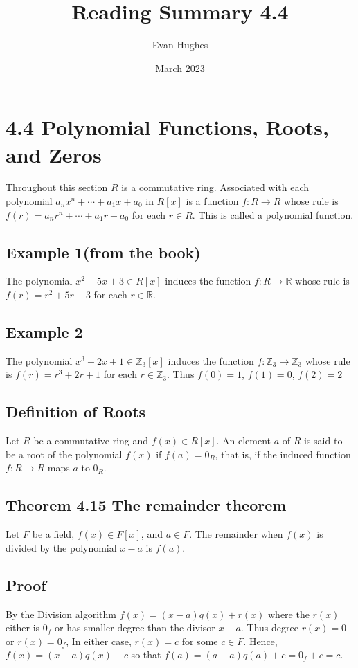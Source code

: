 \documentclass{article}
\title{Reading Summary 4.4}
\author{Evan Hughes}
\date{March 2023}
\begin{document}
\maketitle
\section*{4.4 Polynomial Functions, Roots, and Zeros}
Throughout this section $R$ is a commutative ring. Associated with each polynomial 
$a_nx^n + \cdots + a_1x + a_0$ in $R[x]$ is a function $f:R \to R$ whose rule is $f(r) = a_n r^n + \cdots + a_1 r + a_0$ for each $r \in R$.
This is called a polynomial function.

\subsection*{Example 1(from the book)}
The polynomial $x^2 + 5x + 3 \in R[x]$ induces the function $f:R \to  \mathbb{R}$ whose rule is $f(r) = r^2 + 5r + 3$ for each $r \in \mathbb{R}$.

\subsection*{Example 2}
The polynomial $x^3 + 2x + 1 \in \mathbb{Z}_3[x]$ induces the function $f:\mathbb{Z}_3 \to \mathbb{Z}_3$ whose rule is $f(r) = r^3 + 2r + 1$ for each $r \in \mathbb{Z}_3$.
Thus $f(0) = 1$, $f(1) = 0$, $f(2) = 2$

\subsection*{Definition of Roots}
Let $R$ be a commutative ring and $f(x) \in R[x]$. An element $a$ of $R$ is said to be a root of the polynomial
$f(x)$ if $f(a)=0_R$, that is, if the induced function $f:R \to R$ maps $a$ to $0_R$.

\subsection*{Theorem 4.15 The remainder theorem}
Let $F$ be a field, $f(x) \in F[x]$, and $a \in F$. The remainder when $f(x)$ is divided by the polynomial $x-a$ is $f(a)$.

\subsection*{Proof}
By the Division algorithm $f(x) = (x-a)q(x) + r(x)$ where the $r(x)$ either is 
$0_f$ or has smaller degree than the divisor $x-a$. Thus degree $r(x) = 0$ or $r(x) = 0_f$, 
In either case, $r(x) = c$ for some $c \in F$. Hence, $f(x) = (x-a)q(x) + c$ so that $f(a) = (a-a)q(a) + c = 0_f + c = c$.
\end{document}
